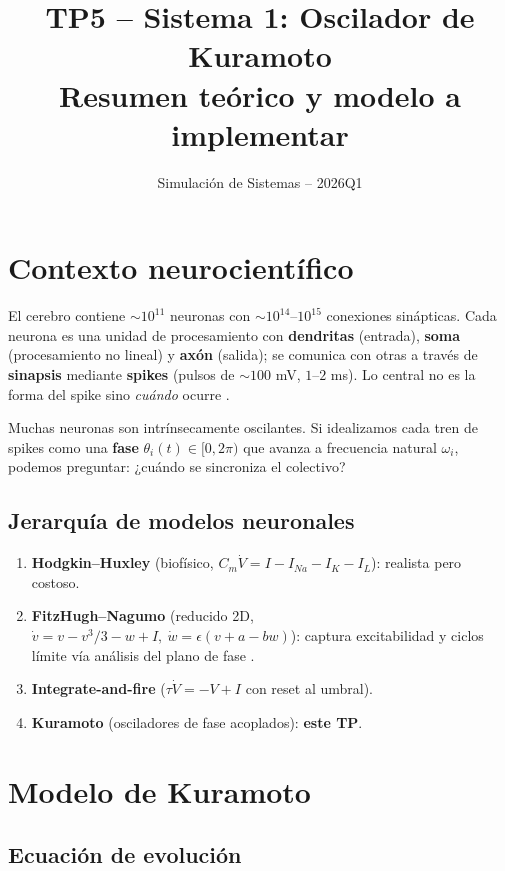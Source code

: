 \documentclass[11pt,a4paper]{article}
\title{\vspace{-1cm}\textbf{TP5 -- Sistema 1: Oscilador de Kuramoto}\\[2pt]\large Resumen teórico y modelo a implementar}
\author{Simulación de Sistemas -- 2026Q1}
\date{}
\begin{document}
\maketitle
\vspace{-0.8cm}

\section{Contexto neurocientífico}

El cerebro contiene $\sim 10^{11}$ neuronas con $\sim 10^{14}$--$10^{15}$ conexiones sinápticas. Cada neurona es una unidad de procesamiento con \textbf{dendritas} (entrada), \textbf{soma} (procesamiento no lineal) y \textbf{axón} (salida); se comunica con otras a través de \textbf{sinapsis} mediante \textbf{spikes} (pulsos de $\sim 100$ mV, $1$--$2$ ms). Lo central no es la forma del spike sino \emph{cuándo} ocurre \cite{ND-Ch1}.

Muchas neuronas son intrínsecamente oscilantes. Si idealizamos cada tren de spikes como una \textbf{fase} $\theta_i(t) \in [0,2\pi)$ que avanza a frecuencia natural $\omega_i$, podemos preguntar: ¿cuándo se sincroniza el colectivo?

\subsection*{Jerarquía de modelos neuronales}

\begin{enumerate}
  \item \textbf{Hodgkin--Huxley} (biofísico, $C_m \dot V = I - I_{Na} - I_K - I_L$): realista pero costoso.
  \item \textbf{FitzHugh--Nagumo} (reducido 2D, $\dot v = v - v^3/3 - w + I,\ \dot w = \epsilon(v+a-bw)$): captura excitabilidad y ciclos límite vía análisis del plano de fase \cite{ND-Ch4}.
  \item \textbf{Integrate-and-fire} ($\tau \dot V = -V + I$ con reset al umbral).
  \item \textbf{Kuramoto} (osciladores de fase acoplados): \textbf{este TP}.
\end{enumerate}

\section{Modelo de Kuramoto}

\subsection*{Ecuación de evolución}
\end{document}
